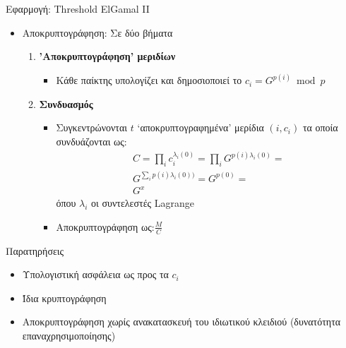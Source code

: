 \documentclass[handout]{beamer}
\begin{document}
\begin{frame}{Εφαρμογή: Threshold ElGamal II}
\begin{itemize}
\item Αποκρυπτογράφηση: Σε δύο βήματα

\begin{enumerate}
\item \textbf{'Αποκρυπτογράφηση' μεριδίων}
\begin{itemize}
\item Κάθε παίκτης υπολογίζει και δημοσιοποιεί το $c_i=G^{p(i)} \bmod p$
\end{itemize}
\item \textbf{Συνδυασμός}
\begin{itemize}
\item Συγκεντρώνονται $t$ `αποκρυπτογραφημένα' μερίδια $(i,c_i)$ τα οποία συνδυάζονται ως: \pause
\begin{align*}
C = \prod_i c_i ^ {\lambda_i(0)} = \prod_i G ^ {p(i) \lambda_i(0)} = \\
G ^ {\sum_i p(i) \lambda_i(0))} = G^{p(0)} = \\ G^x
\end{align*}
όπου $\lambda_i$ οι συντελεστές Lagrange \pause
\item Αποκρυπτογράφηση ως:$ \frac{M}{C} $
\end{itemize}
\end{enumerate}
\end{itemize}
\end{frame}

\begin{frame}{Παρατηρήσεις}
\begin{itemize}
\item Υπολογιστική ασφάλεια ως προς τα $c_i$
\pause
\item Ίδια κρυπτογράφηση
\pause
\item Αποκρυπτογράφηση χωρίς ανακατασκευή του ιδιωτικού κλειδιού (δυνατότητα επαναχρησιμοποίησης)
\end{itemize}
\end{frame}
\end{document}
